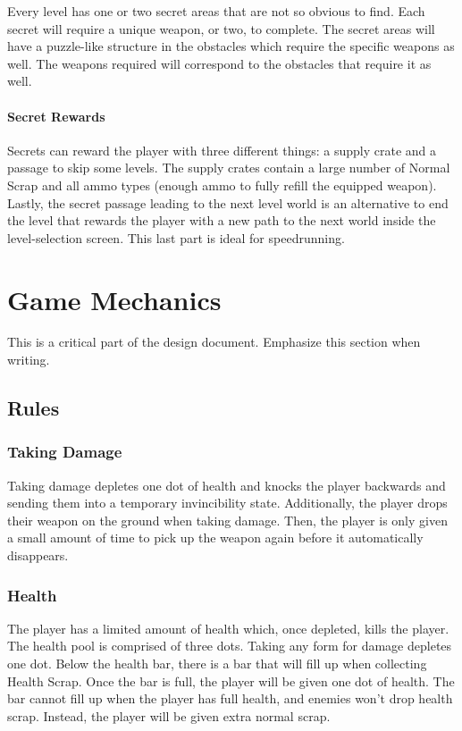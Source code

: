 \documentclass[12pt]{article}
\begin{document}
Every level has one or two secret areas that are not so obvious to find. Each secret will require a unique weapon, or two, to complete. The secret areas will have a puzzle-like structure in the obstacles which require the specific weapons as well. The weapons required will correspond to the obstacles that require it as well. 

\paragraph{Secret Rewards}

Secrets can reward the player with three different things: a supply crate and a passage to skip some levels. The supply crates contain a large number of Normal Scrap and all ammo types (enough ammo to fully refill the equipped weapon). Lastly, the secret passage leading to the next level world is an alternative to end the level that rewards the player with a new path to the next world inside the level-selection screen. This last part is ideal for speedrunning. 

\section{Game Mechanics}

This is a critical part of the design document. Emphasize this section when writing.

\subsection{Rules}

\subsubsection{Taking Damage}

Taking damage depletes one dot of health and knocks the player backwards and sending them into a temporary invincibility state. Additionally, the player drops their weapon on the ground when taking damage. Then, the player is only given a small amount of time to pick up the weapon again before it automatically disappears. 

\subsubsection{Health}

The player has a limited amount of health which, once depleted, kills the player. The health pool is comprised of three dots. Taking any form for damage depletes one dot. Below the health bar, there is a bar that will fill up when collecting Health Scrap. Once the bar is full, the player will be given one dot of health. The bar cannot fill up when the player has full health, and enemies won't drop health scrap. Instead, the player will be given extra normal scrap. 
\end{document}
